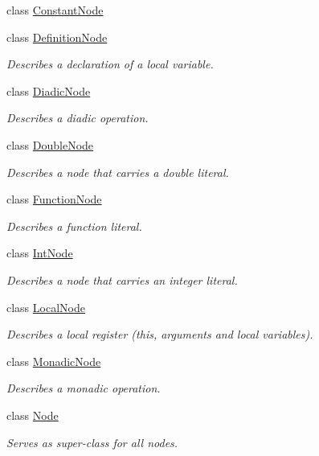 \begin{DoxyCompactItemize}
class \hyperlink{classjswf_1_1avm2_1_1ast_1_1_constant_node}{Constant\+Node}
\item 
class \hyperlink{classjswf_1_1avm2_1_1ast_1_1_definition_node}{Definition\+Node}
\begin{DoxyCompactList}\small\item\em Describes a declaration of a local variable. \end{DoxyCompactList}\item 
class \hyperlink{classjswf_1_1avm2_1_1ast_1_1_diadic_node}{Diadic\+Node}
\begin{DoxyCompactList}\small\item\em Describes a diadic operation. \end{DoxyCompactList}\item 
class \hyperlink{classjswf_1_1avm2_1_1ast_1_1_double_node}{Double\+Node}
\begin{DoxyCompactList}\small\item\em Describes a node that carries a double literal. \end{DoxyCompactList}\item 
class \hyperlink{classjswf_1_1avm2_1_1ast_1_1_function_node}{Function\+Node}
\begin{DoxyCompactList}\small\item\em Describes a function literal. \end{DoxyCompactList}\item 
class \hyperlink{classjswf_1_1avm2_1_1ast_1_1_int_node}{Int\+Node}
\begin{DoxyCompactList}\small\item\em Describes a node that carries an integer literal. \end{DoxyCompactList}\item 
class \hyperlink{classjswf_1_1avm2_1_1ast_1_1_local_node}{Local\+Node}
\begin{DoxyCompactList}\small\item\em Describes a local register ({\ttfamily this}, arguments and local variables). \end{DoxyCompactList}\item 
class \hyperlink{classjswf_1_1avm2_1_1ast_1_1_monadic_node}{Monadic\+Node}
\begin{DoxyCompactList}\small\item\em Describes a monadic operation. \end{DoxyCompactList}\item 
class \hyperlink{classjswf_1_1avm2_1_1ast_1_1_node}{Node}
\begin{DoxyCompactList}\small\item\em Serves as super-\/class for all nodes. \end{DoxyCompactList}\item 

\end{DoxyCompactItemize}
